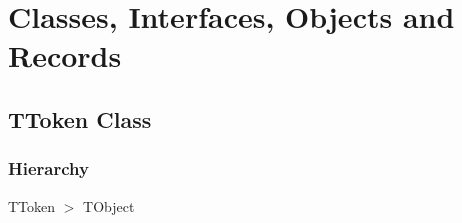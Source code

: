 \documentclass{report}
\newif\ifpdf
\begin{document}
\section{Classes, Interfaces, Objects and Records}
\ifpdf
\subsection*{\large{\textbf{TToken Class}}\normalsize\hspace{1ex}\hrulefill}
\else
\subsection*{TToken Class}
\fi
\label{PasDoc_Tokenizer.TToken}
\subsubsection*{\large{\textbf{Hierarchy}}\normalsize\hspace{1ex}\hfill}
TToken {$>$} TObject
\end{document}
